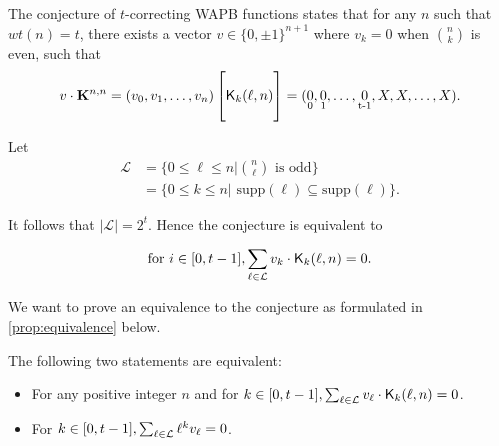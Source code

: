 The conjecture of $t$-correcting WAPB functions states that for any $n$ such that $wt(n) = t$, there exists a vector $v \in \{0, \pm 1\}^{n+1}$ where $v_k = 0$ when $\binom{n}{k}$ is even, such that
$$
v \cdot \mathbf{K}^{n,n} = (v_0, v_1, \ldots, v_n)
\begin{bmatrix}
    \\
    \mathsf{K}_{k}(\ell,n)\\
    \\
\end{bmatrix} = (\underset{\operatorname{0}}{0}, \underset{\operatorname{1}}{0}, \ldots, \underset{\operatorname{t - 1}}{0}, X, X, \ldots, X).
$$

Let
\begin{equation*}
\begin{split}
    \mathcal{L} &= \{0 \leq \ell \leq n | \binom{n}{\ell} \text{ is odd}\}\\
    &=\{0 \leq k \leq n | \text{ supp}(\ell) \subseteq \text{supp}(\ell)\}.
\end{split}
\end{equation*}

It follows that $|\mathcal{L}| = 2^t$. Hence the conjecture is equivalent to

\begin{equation}\label{eq:statement}
    \text{for } i \in [0, t-1], \sum_{\ell \in \mathcal{L}} v_k \cdot \mathsf{K}_{k}(\ell,n) = 0.
\end{equation}

We want to prove an equivalence to the conjecture as formulated in \cref{prop:equivalence} below.
\begin{proposition}\label{prop:equivalence}
    The following two statements are equivalent:
    \begin{itemize}
        \item For any positive integer $n$ and for $k \in [0, t-1], \sum_{\ell \in \mathcal{L}} v_\ell \cdot \mathsf{K}_{k}(\ell,n) = 0$.
        \item For $k \in [0,t-1], \sum_{\ell \in \mathcal{L}} \ell^kv_\ell= 0$.
    \end{itemize}
\end{proposition}

